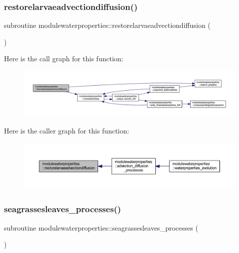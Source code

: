 \subsubsection{\texorpdfstring{restorelarvaeadvectiondiffusion()}{restorelarvaeadvectiondiffusion()}}
{\footnotesize\ttfamily subroutine modulewaterproperties\+::restorelarvaeadvectiondiffusion (\begin{DoxyParamCaption}{ }\end{DoxyParamCaption})\hspace{0.3cm}{\ttfamily [private]}}

Here is the call graph for this function\+:\nopagebreak
\begin{figure}[H]
\begin{center}
\leavevmode
\includegraphics[width=350pt]{namespacemodulewaterproperties_abd63efefa04ded5606dbc3b60797d347_cgraph}
\end{center}
\end{figure}
Here is the caller graph for this function\+:\nopagebreak
\begin{figure}[H]
\begin{center}
\leavevmode
\includegraphics[width=350pt]{namespacemodulewaterproperties_abd63efefa04ded5606dbc3b60797d347_icgraph}
\end{center}
\end{figure}
\mbox{\label{namespacemodulewaterproperties_adf800c8c0d5bdc30d00d4b10c88f9693}} 
\subsubsection{\texorpdfstring{seagrassesleaves\+\_\+processes()}{seagrassesleaves\_processes()}}
{\footnotesize\ttfamily subroutine modulewaterproperties\+::seagrassesleaves\+\_\+processes (\begin{DoxyParamCaption}{ }\end{DoxyParamCaption})\hspace{0.3cm}{\ttfamily [private]}}


